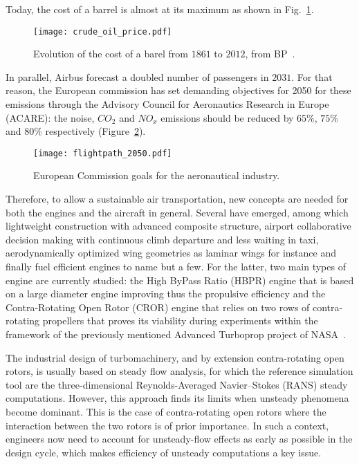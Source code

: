 Today, the cost of a barrel is almost at its maximum as shown
in Fig.~\ref{fig:crude_oil_price}.
\begin{figure}[htp]
  \centering
  \texttt{[image: crude\_oil\_price.pdf]}
  \caption{Evolution of the cost of a barel from $1861$ to $2012$, from BP~\cite{bpreview2013}.}
  \label{fig:crude_oil_price}
\end{figure}
In parallel, Airbus forecast a doubled number of passengers in
$2031$. For that reason, the European commission has set
demanding objectives for 2050 for these emissions
through the
Advisory Council for 
Aeronautics Research in Europe (ACARE):
the noise, $CO_2$ and $NO_x$ emissions should be reduced by 
$65\%$, $75\%$ and $80\%$ respectively
(Figure~\ref{fig:flightpath_2050}).
\begin{figure}[htp]
  \centering
  \texttt{[image: flightpath\_2050.pdf]}
  \caption{European Commission goals for the aeronautical industry.}
  \label{fig:flightpath_2050}
\end{figure}
Therefore, to allow a sustainable air transportation, new
concepts are needed for both the engines and the 
aircraft in general.
Several have emerged, among which lightweight construction
with advanced composite structure, airport collaborative decision
making with continuous climb departure and less waiting in taxi,
aerodynamically optimized wing geometries as laminar wings for instance
and finally fuel efficient engines to name but a few.
For the latter, two main types of engine are currently studied: the
High ByPass Ratio (HBPR) engine that is based on a
large diameter engine improving thus the
propulsive efficiency and the Contra-Rotating Open Rotor (CROR)
engine that relies on two rows of contra-rotating propellers
that proves its viability during experiments within the framework of
the previously mentioned Advanced Turboprop project of NASA~\cite{Hager1988}.


The industrial design of turbomachinery, and by extension contra-rotating
open rotors, is usually based on steady flow analysis, 
for which the reference simulation tool are the three-dimensio\-nal Reynolds-Averaged 
Navier--Stokes (RANS) steady computations. However, this approach finds its limits 
when unsteady phenomena become dominant. This is the case of 
contra-rotating open rotors where the interaction between the
two rotors is of prior importance.
In such a context, engineers now 
need to account for unsteady-flow effects as early as possible in the design 
cycle, which makes efficiency of unsteady computations a key issue. 

